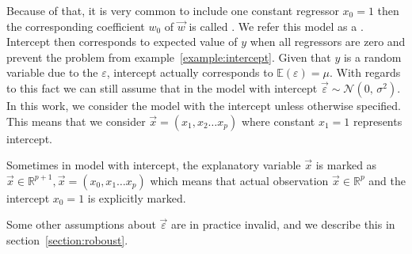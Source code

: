 Because of that, it is very common to include one constant regressor $x_0 = 1$ then the corresponding coefficient $w_0$ of $\vec{w}$ is called . We refer this model as a . Intercept then corresponds to expected value of $y$ when all regressors are zero and prevent the problem from example~\ref{example:intercept}. Given that $y$ is a random variable due to the $\varepsilon$, intercept actually corresponds to $\mathbb{E}(\varepsilon) = \mu$. With regards to this fact we can still assume that in the model with intercept $\vec{\varepsilon} \sim \mathcal{N}(0,\,\sigma^{2})$.
In this work, we consider the model with the intercept unless otherwise specified. This means that we consider $\vec{x} = (x_1, x_2 \ldots x_p)$ where constant $x_1 = 1$ represents intercept.  
\begin{note}
Sometimes in model with intercept, the explanatory variable $\vec{x}$  is marked as $\vec{x} \in \mathbb{R}^{p+1}, \vec{x} = (x_0, x_1 \ldots x_p)$ 
which means that actual observation $\vec{x} \in \mathbb{R}^p$ and the intercept $x_0 = 1$ is explicitly marked.
\end{note} 

Some other assumptions about  $\vec{\varepsilon}$ are in practice invalid, and we describe this in section~\ref{section:roboust}.




